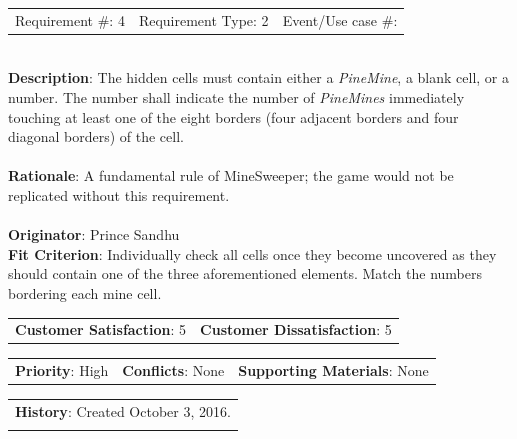 \documentclass[12pt, titlepage]{article}
\begin{document}
\begin{reqbox}

\begin{tabular}{lll}
Requirement \#: 4 & Requirement Type: 2 & Event/Use case \#: \\
\end{tabular} \\

\textbf{Description}: The hidden cells must contain either a \textit{PineMine}, a blank cell, or a number. The number shall indicate the number of \textit{PineMines} immediately touching at least one of the eight borders (four adjacent borders and four diagonal borders) of the cell. \\ \\
\textbf{Rationale}: A fundamental rule of MineSweeper; the game would not be replicated without this 				    requirement.\\ \\
\textbf{Originator}: Prince Sandhu \\
\textbf{Fit Criterion}: Individually check all cells once they become uncovered as they should contain one of the three
aforementioned elements. Match the numbers bordering each mine cell.\\

\begin{tabular}{ll}
\textbf{Customer Satisfaction}: 5 & \textbf{Customer Dissatisfaction}: 5 \\
\end{tabular}

\begin{tabular}{lll}
\textbf{Priority}: High & \textbf{Conflicts}: None & \textbf{Supporting Materials}: None \\
\end{tabular}

\begin{tabular}{l}
\textbf{History}: Created October 3, 2016.\\ \\
\end{tabular} \\

\end{reqbox}
\end{document}

